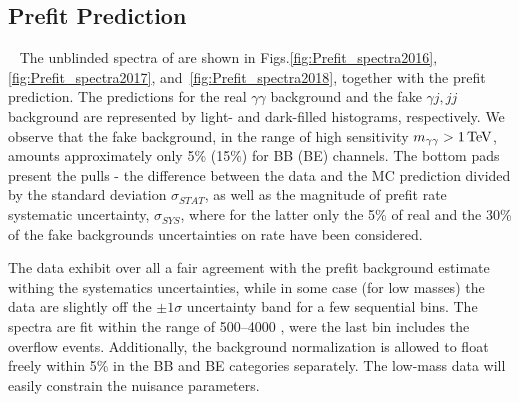 \subsection{Prefit Prediction}~\label{sec:Prefit}
The unblinded spectra of \mgg are shown in Figs.\ref{fig:Prefit_spectra2016},\ref{fig:Prefit_spectra2017}, and~\ref{fig:Prefit_spectra2018}, together with the prefit prediction. The predictions for the real $\gamma\gamma$ background and the fake $\gamma j, jj$ background are represented by light- and dark-filled histograms, respectively. We observe that the fake background, in the range of high sensitivity $m_{\gamma\gamma}>1\,\text{Te\hspace{-.08em}V}$, amounts approximately only 5\% (15\%) for BB (BE) channels. 
The bottom pads present the pulls - the difference between the data and the MC prediction divided by the standard deviation $\sigma_{STAT}$, as well as the magnitude of prefit rate systematic uncertainty, $\sigma_{SYS}$, where for the latter only the 5\% of real and the 30\% of the fake backgrounds uncertainties on rate have been considered.

The data exhibit over all a fair agreement with the prefit background estimate withing the systematics uncertainties, while in some case (for low masses) the data are slightly off the $\pm1\sigma$ uncertainty band for a few sequential bins. The spectra are fit within the range of 500--4000 \GeV, were the last bin includes the overflow events. Additionally, the \mgg background normalization is allowed to float freely within 5\% in the BB and BE categories separately. The low-mass data will easily constrain the nuisance parameters.

